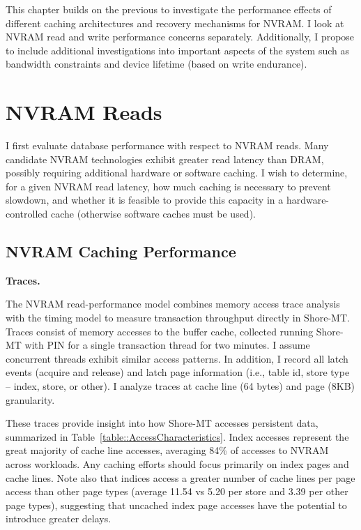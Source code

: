 This chapter builds on the previous to investigate the performance effects of different caching architectures and recovery mechanisms for NVRAM.
I look at NVRAM read and write performance concerns separately.
Additionally, I propose to include additional investigations into important aspects of the system such as bandwidth constraints and device lifetime (based on write endurance).

\section{NVRAM Reads}
\label{sec:OLTP_eval:Reads}

I first evaluate database performance with respect to NVRAM reads.
Many candidate NVRAM technologies exhibit greater read latency than DRAM, possibly requiring additional hardware or software caching.
I wish to determine, for a given NVRAM read latency, how much caching is necessary to prevent slowdown, and whether it is feasible to provide this capacity in a hardware-controlled cache (otherwise software caches must be used).

\subsection{NVRAM Caching Performance}
\label{sec:OLTP_eval:Reads:Performance}

\textbf{Traces.}

The NVRAM read-performance model combines memory access trace analysis with the timing model to measure transaction throughput directly in Shore-MT.
Traces consist of memory accesses to the buffer cache, collected running Shore-MT with PIN for a single transaction thread for two minutes.
I assume concurrent threads exhibit similar access patterns.
In addition, I record all latch events (acquire and release) and latch page information (i.e., table id, store type -- index, store, or other).
I analyze traces at cache line (64 bytes) and page (8KB) granularity.

These traces provide insight into how Shore-MT accesses persistent data, summarized in Table~\ref{table::AccessCharacteristics}.
Index accesses represent the great majority of cache line accesses, averaging 84\% of accesses to NVRAM across workloads.
Any caching efforts should focus primarily on index pages and cache lines.
Note also that indices access a greater number of cache lines per page access than other page types (average 11.54 vs 5.20 per store and 3.39 per other page types), suggesting that uncached index page accesses have the potential to introduce greater delays. 


